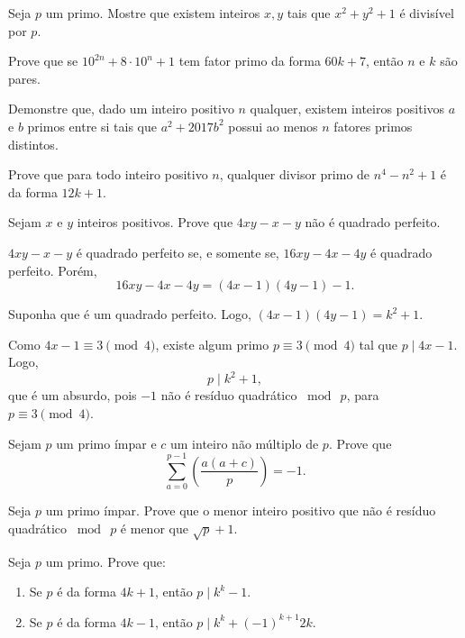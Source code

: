 \documentclass[10pt,a4paper]{article}
\newcommand{\leg}[2]{\left(\frac{#1}{#2}\right)}
\newcommand{\tmod}[1]{\bmod{\ #1}}
\begin{document}
	\begin{prob}
		Seja $p$ um primo. Mostre que existem inteiros $x, y$ tais que $x^2 + y^2 + 1$ é divisível por $p$.
	\end{prob}
	\begin{prob}[OBM]
		Prove que se $10^{2n} + 8 \cdot 10^n + 1$ tem fator primo da forma $60k + 7$, então $n$ e $k$ são pares.
	\end{prob}
	\begin{prob}[OBM]
		Demonstre que, dado um inteiro positivo $n$ qualquer, existem inteiros positivos $a$ e $b$ primos entre si tais que $a^2 + 2017b^2$ possui ao menos $n$ fatores primos distintos.
	\end{prob}
	\begin{prob}
		Prove que para todo inteiro positivo $n$, qualquer divisor primo de $n^4 - n^2 + 1$ é da forma $12k + 1$.
	\end{prob}
	\begin{prob}
		Sejam $x$ e $y$ inteiros positivos. Prove que $4xy - x - y$ não é quadrado perfeito.
	\end{prob}
	\begin{sol}
		$4xy - x - y$ é quadrado perfeito se, e somente se, $16xy - 4x - 4y$ é quadrado perfeito.
		Porém, \[16xy - 4x - 4y = (4x-1)(4y-1) - 1.\]

		Suponha que é um quadrado perfeito. Logo, $(4x - 1)(4y - 1) = k^2 + 1$.

		Como $4x - 1 \equiv 3 \pmod{4}$, existe algum primo $p \equiv 3 \pmod{4}$ tal que $p \mid 4x-1$. Logo, \[p \mid k^2 + 1,\]
		que é um absurdo, pois $-1$ não é resíduo quadrático $\tmod{p}$, para $p \equiv 3 \pmod{4}$.

	\end{sol}
	\begin{prob}
		Sejam $p$ um primo ímpar e $c$ um inteiro não múltiplo de $p$. Prove que
		$$\sum_{a = 0}^{p-1}\leg{a(a+c)}{p} = -1.$$
	\end{prob}
	\begin{prob}
		Seja $p$ um primo ímpar. Prove que o menor inteiro positivo que não é resíduo quadrático $\tmod{p}$ é menor que $\sqrt{p} + 1$.
	\end{prob}
	\begin{prob}
		Seja $p$ um primo. Prove que:
		\begin{enumerate}[label = (\alph*)]
			\item Se $p$ é da forma $4k+1$, então $p \mid k^k - 1$.
			\item Se $p$ é da forma $4k-1$, então $p \mid k^k + (-1)^{k+1}2k$.
		\end{enumerate}
	\end{prob}
\end{document}
